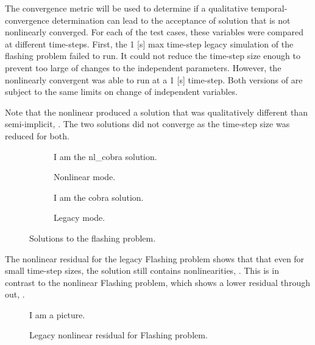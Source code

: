 
The convergence metric will be used to determine if a qualitative temporal-convergence determination can lead to the acceptance of solution that is not nonlinearly converged.
For each of the test cases, these variables were compared at different time-steps.
First, the 1 [s] max time-step legacy simulation of the flashing problem failed to run.
It could not reduce the time-step size enough to prevent too large of changes to the independent parameters.
However, the nonlinearly convergent \cobra{} was able to run at a 1 [s] time-step.
Both versions of \cobra{} are subject to the same limits on change of independent variables.

Note that the nonlinear \cobra{} produced a solution that was qualitatively different than semi-implicit, .
The two solutions did not converge as the time-step size was reduced for both.

\begin{figure}
        \centering
        \begin{subfigure}[b]{0.48\textwidth}
                \centering
				I am the nl\_cobra solution.
                \caption{Nonlinear mode.}
                \label{fig:gull}
        \end{subfigure}%
        \begin{subfigure}[b]{0.48\textwidth}
                \centering
				I am the cobra solution.
                \caption{Legacy mode.}
                \label{fig:tiger}
        \end{subfigure}
        \caption{Solutions to the flashing problem.}
        \label{fig:flashing_solution}
\end{figure}

The nonlinear residual for the legacy Flashing problem shows that that even for small time-step sizes, the solution still contains nonlinearities, .
This is in contrast to the nonlinear Flashing problem, which shows a lower residual through out, .

\begin{figure}[h!t]
\begin{center}
I am a picture.
\end{center}
\caption{Legacy \cobra{} nonlinear residual for Flashing problem.}
\label{fig:legacy_flashing_residual}
\end{figure}

